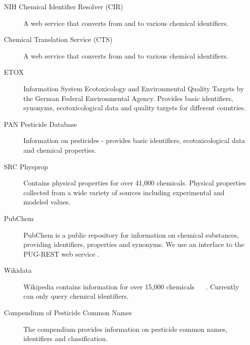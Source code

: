 \documentclass[article, shortnames]{jss}\usepackage[]{graphicx}\usepackage[]{color}
\providecommand{\DIFaddbegin}{} %
\providecommand{\DIFaddend}{} %
\providecommand{\DIFdelbegin}{} %
\providecommand{\DIFdelend}{} %
\begin{document}
\begin{description}
  \item[NIH Chemical Identifier Resolver (CIR) \citep{cir}]{A web service that converts from and to various chemical identifiers.}
  \item[Chemical Translation Service (CTS) \citep{Wohlgemuth_Haldiya_Willighagen_Kind_Fiehn_2010}]{A web service that converts from and to various chemical identifiers.}
  \item[ETOX \citep{etox}]{Information System Ecotoxicology and Environmental Quality Targets by the German Federal Environmental Agency. Provides basic identifiers, synonyms, ecotoxicological data and quality targets for different countries.}
  \item[PAN Pesticide Database \citep{pan}]{Information on pesticides - provides basic identifiers, ecotoxicological data and chemical properties.}
  \DIFdelbegin %
\DIFdelend \DIFaddbegin \item[SRC Physprop \mbox{%
\citep{physprop}
}%
]{Contains physical properties for over 41,000 chemicals.
  Physical properties collected from a wide variety of sources including experimental and modeled values.}
  \DIFaddend \item[PubChem \citep{Kim_2016}]{PubChem is a public repository for information on chemical substances, providing identifiers, properties and synonyms.
  We use an interface to the PUG-REST web service \citep{Kim_Thiessen_Bolton_Bryant_2015}.}
  \DIFdelbegin %
\DIFdelend \DIFaddbegin \item[Wikidata \mbox{%
\citep{wiki}
}%
]{Wikipedia contains information for over 15,000 chemicals \mbox{%
\citep{Ertl_Patiny_Sander_Rufener_Zasso_2015}
}%
. Currently  can only query chemical identifiers.}
  \DIFaddend \item[Compendium of Pesticide Common Names \citep{wood}]{The compendium provides information on pesticide common names, identifiers and classification.}

\end{description}
\end{document}
